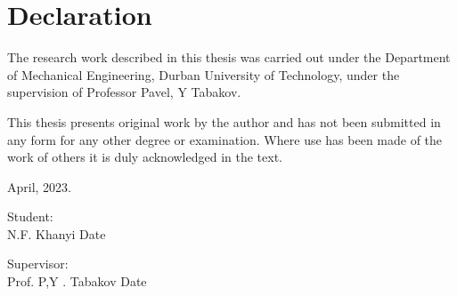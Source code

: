 \chapter{Declaration}
The research work described in this thesis was carried out under the Department of Mechanical Engineering, Durban University of Technology, under the supervision of Professor Pavel, Y Tabakov.   

\noindent This thesis presents original work by the author and has not been submitted in any form for any other degree or examination. Where use has been made of the work of others it is duly acknowledged in the text. \newline

\begin{flushright}
April, 2023.
\end{flushright} 

Student: \\
N.F. Khanyi	Date

Supervisor: \\
Prof. P,Y . Tabakov Date